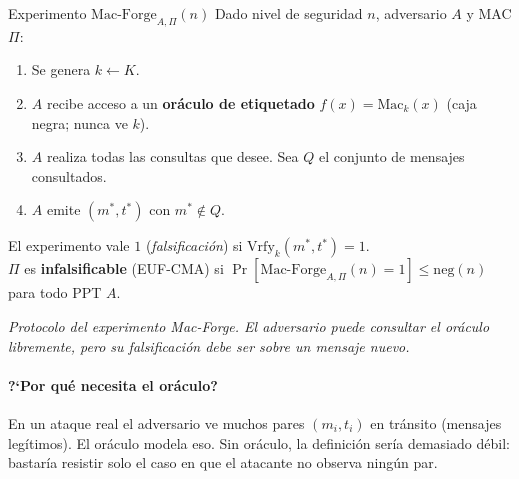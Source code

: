 \documentclass[11pt,a4paper]{article}
\newcommand{\diagcaption}[1]{\begin{center}\small\textit{#1}\end{center}}
\begin{document}
\begin{definicion}{Experimento $\mathrm{Mac\text{-}Forge}_{A,\Pi}(n)$}
Dado nivel de seguridad $n$, adversario $A$ y MAC $\Pi$:
\begin{enumerate}[leftmargin=1.6em,nosep]
  \item Se genera $k \leftarrow K$.
  \item $A$ recibe acceso a un \textbf{or\'aculo de etiquetado} $f(x)=\mathrm{Mac}_k(x)$
        (caja negra; nunca ve $k$).
  \item $A$ realiza todas las consultas que desee.  Sea $Q$ el conjunto de mensajes
        consultados.
  \item $A$ emite $(m^*,t^*)$ con $m^* \notin Q$.
\end{enumerate}
El experimento vale $1$ (\emph{falsificaci\'on}) si $\mathrm{Vrfy}_k(m^*,t^*)=1$.\\[2pt]
$\Pi$ es \textbf{infalsificable} (EUF-CMA) si
$\Pr[\mathrm{Mac\text{-}Forge}_{A,\Pi}(n)=1] \le \mathrm{neg}(n)$
para todo PPT $A$.
\end{definicion}

\begin{center}
\end{center}
\diagcaption{Protocolo del experimento Mac-Forge.  El adversario puede consultar el
or\'aculo libremente, pero su falsificaci\'on debe ser sobre un mensaje \emph{nuevo}.}

\paragraph{?`Por qu\'e necesita el or\'aculo?}  En un ataque real el adversario ve
muchos pares $(m_i, t_i)$ en tr\'ansito (mensajes leg\'itimos).  El or\'aculo modela
eso.  Sin or\'aculo, la definici\'on ser\'ia demasiado d\'ebil: bastar\'ia resistir
solo el caso en que el atacante no observa ning\'un par.
\end{document}
